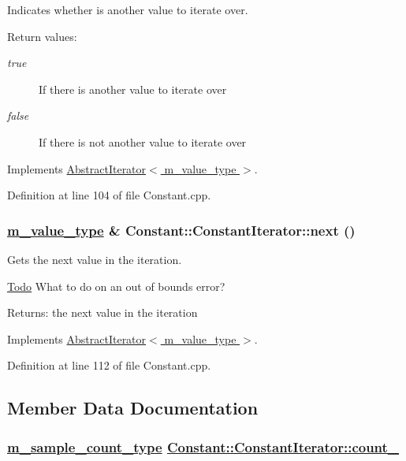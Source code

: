 Indicates whether is another value to iterate over. \begin{Desc}
\item[Return values:]
\begin{description}
\item[{\em true}]If there is another value to iterate over \item[{\em false}]If there is not another value to iterate over \end{description}
\end{Desc}


Implements \hyperlink{classAbstractIterator_a1}{Abstract\-Iterator$<$ m\_\-value\_\-type $>$}.

Definition at line 104 of file Constant.cpp.\hypertarget{classConstant_1_1ConstantIterator_a3}{
\subsubsection[next]{\setlength{\rightskip}{0pt plus 5cm}\hyperlink{Types_8h_a3}{m\_\-value\_\-type} \& Constant::Constant\-Iterator::next ()}}
\label{classConstant_1_1ConstantIterator_a3}


Gets the next value in the iteration. 

\begin{Desc}
\item[\hyperlink{todo__todo000005}{Todo}]What to do on an out of bounds error?\end{Desc}
\begin{Desc}
\item[Returns:]the next value in the iteration \end{Desc}


Implements \hyperlink{classAbstractIterator_a2}{Abstract\-Iterator$<$ m\_\-value\_\-type $>$}.

Definition at line 112 of file Constant.cpp.

\subsection{Member Data Documentation}
\hypertarget{classConstant_1_1ConstantIterator_r1}{
\subsubsection[count\_\-]{\setlength{\rightskip}{0pt plus 5cm}\hyperlink{Types_8h_a1}{m\_\-sample\_\-count\_\-type} \hyperlink{classConstant_1_1ConstantIterator_r1}{Constant::Constant\-Iterator::count\_\-}}}
\label{classConstant_1_1ConstantIterator_r1}




